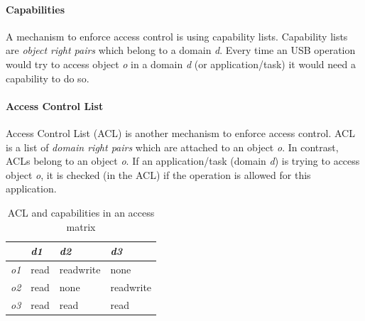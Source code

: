 \documentclass{acm_proc_article-sp}
\begin{document}
\paragraph{Capabilities}
A mechanism to enforce access control is using capability lists.
Capability lists are \emph{object right pairs} which belong to a domain \emph{d}.
Every time an USB operation would try to access object \emph{o} in a domain \emph{d} (or application/task)
it would need a capability to do so.

\paragraph{Access Control List}
Access Control List (ACL) is another mechanism to enforce access control.
ACL is a list of \emph{domain right pairs} which are attached to an object \emph{o}.
In contrast, ACLs belong to an object \emph{o}.
If an application/task (domain \emph{d}) is trying to access object \emph{o}, it is checked
(in the ACL) if the operation is allowed for this application.

\begin{table}
\centering
\caption{ACL and capabilities in an access matrix}
\label{tab:acmatrix}
\begin{tabular}{|l|l|l|l|} \hline
          & \emph{d1} & \emph{d2} & \emph{d3} \\ \hline
\emph{o1} & read & readwrite & none \\ \hline
\emph{o2} & read & none & readwrite \\ \hline
\emph{o3} & read & read & read \\ \hline
\end{tabular}
\end{table}
\end{document}

